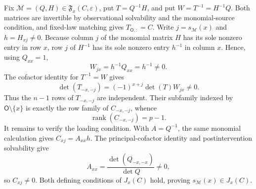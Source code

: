 Fix \(\mathcal M=(Q,H)\in\mathfrak F_x(C,\varepsilon)\), put \(T=Q^{-1}H\), and put \(W=T^{-1}=H^{-1}Q\). Both matrices are invertible by observational solvability and the monomial-source condition, and fixed-law matching gives \(T_{\mathsf O,:}=C\). Write \(j=s_{\mathcal M}(x)\) and \(h=H_{xj}\ne0\). Because column \(j\) of the monomial matrix \(H\) has its sole nonzero entry in row \(x\), row \(j\) of \(H^{-1}\) has its sole nonzero entry \(h^{-1}\) in column \(x\). Hence, using \(Q_{xx}=1\),
\[
 W_{jx}=h^{-1}Q_{xx}=h^{-1}\ne0.
\]
The cofactor identity for \(T^{-1}=W\) gives
\[
 \det(T_{-x,-j})=(-1)^{x+j}\det(T)W_{jx}\ne0.
\]
Thus the \(n-1\) rows of \(T_{-x,-j}\) are independent. Their subfamily indexed by \(\mathsf O\setminus\{x\}\) is exactly the row family of \(C_{-x,-j}\), whence
\[
 \operatorname{rank}(C_{-x,-j})=p-1.
\]
It remains to verify the loading condition. With \(A=Q^{-1}\), the same monomial calculation gives \(C_{xj}=A_{xx}h\). The principal-cofactor identity and postintervention solvability give
\[
 A_{xx}=\frac{\det(Q_{-x,-x})}{\det Q}\ne0,
\]
so \(C_{xj}\ne0\). Both defining conditions of \(J_x(C)\) hold, proving \(s_{\mathcal M}(x)\in J_x(C)\).